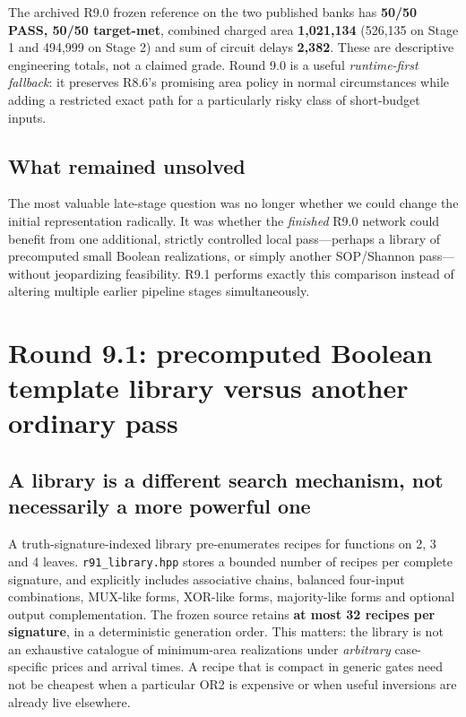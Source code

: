 The archived R9.0 frozen reference on the two published banks has \textbf{50/50 PASS, 50/50 target-met}, combined charged area \textbf{1,021,134} (526,135 on Stage 1 and 494,999 on Stage 2) and sum of circuit delays \textbf{2,382}. These are descriptive engineering totals, not a claimed grade. Round 9.0 is a useful \emph{runtime-first fallback}: it preserves R8.6's promising area policy in normal circumstances while adding a restricted exact path for a particularly risky class of short-budget inputs.

\subsection{What remained unsolved}\label{what-remained-unsolved}

The most valuable late-stage question was no longer whether we could change the initial representation radically. It was whether the \emph{finished} R9.0 network could benefit from one additional, strictly controlled local pass---perhaps a library of precomputed small Boolean realizations, or simply another SOP/Shannon pass---without jeopardizing feasibility. R9.1 performs exactly this comparison instead of altering multiple earlier pipeline stages simultaneously.

\section{Round 9.1: precomputed Boolean template library versus another ordinary pass}\label{round-9.1-precomputed-boolean-template-library-versus-another-ordinary-pass}

\subsection{A library is a different search mechanism, not necessarily a more powerful one}\label{a-library-is-a-different-search-mechanism-not-necessarily-a-more-powerful-one}

A truth-signature-indexed library pre-enumerates recipes for functions on 2, 3 and 4 leaves. \texttt{r91\_library.hpp} stores a bounded number of recipes per complete signature, and explicitly includes associative chains, balanced four-input combinations, MUX-like forms, XOR-like forms, majority-like forms and optional output complementation. The frozen source retains \textbf{at most 32 recipes per signature}, in a deterministic generation order. This matters: the library is not an exhaustive catalogue of minimum-area realizations under \emph{arbitrary} case-specific prices and arrival times. A recipe that is compact in generic gates need not be cheapest when a particular OR2 is expensive or when useful inversions are already live elsewhere.

